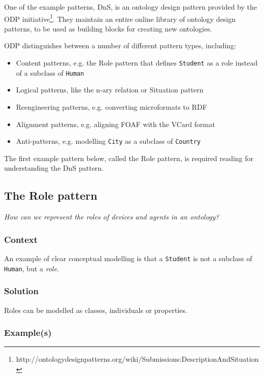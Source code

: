 One of the example patterns, \ac{DnS}, is an ontology design pattern provided by the \ac{ODP} initiative\footnote{http://ontologydesignpatterns.org/wiki/Submissions:DescriptionAndSituation}. They maintain an entire online library of ontology design patterns, to be used as building blocks for creating new ontologies. 

\ac{ODP} distinguishes between a number of different pattern types, including:

\begin{itemize}
	\item Content patterns, e.g. the Role pattern that defines \texttt{Student} as a role instead of a subclass of \texttt{Human}
	\item Logical patterns, like the n-ary relation or Situation pattern
	\item Reengineering patterns, e.g. converting microformats to \ac{RDF}
	\item Alignment patterns, e.g. aligning \ac{FOAF} with the VCard format
	\item Anti-patterns, e.g. modelling \texttt{City} as a subclass of \texttt{Country}
\end{itemize}

The first example pattern below, called the Role pattern, is required reading for understanding the \ac{DnS} pattern.


\subsection{The Role pattern}\label{Roles}

\emph{How can we represent the roles of devices and agents in an ontology?}

\subsubsection{Context}
An example of clear conceptual modelling\label{ClearConceptualModelling} is that a \texttt{Student} is not a subclass of \texttt{Human}, but a \emph{role}.

\subsubsection{Solution}

Roles can be modelled as classes, individuals or properties.

\subsubsection{Example(s)}


